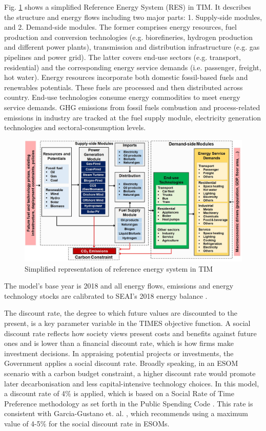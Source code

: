 \documentclass[journal abbreviation, manuscript]{copernicus}
\begin{document}
Fig. \ref{fig:TIM-RES} shows a simplified Reference Energy System (RES) in TIM. It describes the structure and energy flows including two major parts: 1. Supply-side modules, and 2. Demand-side modules. The former comprises energy resources, fuel production and conversion technologies (e.g. biorefineries, hydrogen production and different power plants), transmission and distribution infrastructure (e.g. gas pipelines and power grid). The latter covers end-use sectors (e.g. transport, residential) and the corresponding energy service demands (i.e. passenger, freight, hot water). Energy resources incorporate both domestic fossil-based fuels and renewables potentials. These fuels are processed and then distributed across country. End-use technologies consume energy commodities to meet energy service demands. GHG emissions from fossil fuels combustion and process-related emissions in industry are tracked at the fuel supply module, electricity generation technologies and sectoral-consumption levels. 

\begin{figure}[h!]
 \centering
 \includegraphics[scale=0.48]{TIM_RES.jpg} 
 \caption{Simplified representation of reference energy system in TIM}
 \label{fig:TIM-RES}
\end{figure}

The model's base year is 2018 and all energy flows, emissions and energy technology stocks are calibrated to SEAI's 2018 energy balance \citep{SEAI2019}.

The discount rate, the degree to which future values are discounted to the present, is a key parameter variable in the TIMES objective function. A social discount rate reflects how society views present costs and benefits against future ones and is lower than a financial discount rate, which is how firms make investment decisions. In appraising potential projects or investments, the Government applies a social discount rate. Broadly speaking, in an ESOM scenario with a carbon budget constraint, a higher discount rate would promote later decarbonisation and less capital-intensive technology choices. In this model, a discount rate of 4\% is applied, which is based on a Social Rate of Time Preference methodology as set forth in the Public Spending Code \citep{OCallaghan2018}. This rate is consistent with Garcia-Gustano et. al. \citep{Garcia-Gusano2016}, which recommends using a maximum value of 4-5\% for the social discount rate in ESOMs. 
\end{document}
